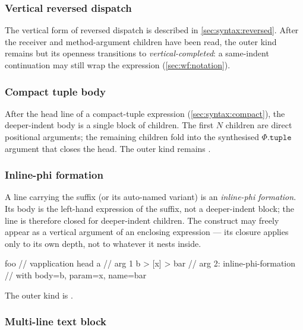 \subsubsection{Vertical reversed dispatch}\label{sec:syntax:vreversed}

The vertical form of reversed dispatch is described in
  \cref{sec:syntax:reversed}.
After the receiver and method-argument children have been read, the outer
  kind remains  but its openness transitions to
  \emph{vertical-completed}: a same-indent  continuation may
  still wrap the expression
  (\cref{sec:wf:notation}).

\subsubsection{Compact tuple body}\label{sec:syntax:vcompact}

After the head line of a compact-tuple expression (\cref{sec:syntax:compact}),
  the deeper-indent body is a single block of children.
The first \(N\) children are direct positional arguments;
  the remaining children fold into the synthesised \(\Phi.\mathtt{tuple}\)
  argument that closes the head.
The outer kind remains .

\subsubsection{Inline-phi formation}\label{sec:syntax:inline-phi}

A line carrying the suffix  (or its auto-named
  variant) is an \emph{inline-phi formation}.
Its body is the left-hand expression of the suffix, not a deeper-indent block;
  the line is therefore closed for deeper-indent children.
The construct may freely appear as a vertical argument of an enclosing
  expression --- its closure applies only to its own depth, not to whatever
  it nests inside.

\begin{ffcode}
foo                            // vapplication head
  a                            //   arg 1
  b > [x] > bar                //   arg 2: inline-phi-formation
                               //   with body=b, param=x, name=bar
\end{ffcode}

The outer kind is .

\subsubsection{Multi-line text block}\label{sec:syntax:vtext}

